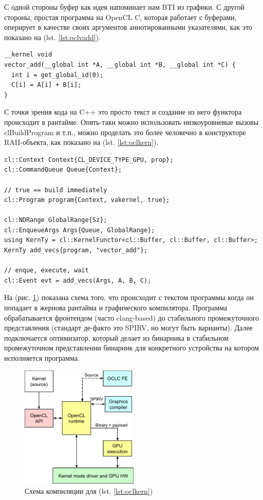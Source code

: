 \documentclass[a4paper,12pt,oneside]{article}
\begin{document}
С одной стороны буфер как идея напоминает нам BTI из графики. С другой стороны, простая программа на OpenCL C, которая работает с буферами, оперирует в качестве своих аргументов аннотированными указателями, как это показано на (lst. \ref{lst:oclvadd}).

\begin{lstlisting}[caption={Векторное сложение, OpenCL},label={lst:oclvadd}]
__kernel void
vector_add(__global int *A, __global int *B, __global int *C) {
  int i = get_global_id(0);
  C[i] = A[i] + B[i];
}
\end{lstlisting}

С точки зрения кода на C++ это просто текст и создание из него функтора происходит в рантайме.
Опять-таки можно использовать низкоуровневые вызовы clBuildProgram и т.п., можно проделать это более человечно в конструкторе RAII-объекта, как показано на (lst. \ref{lst:oclkern}).

\begin{lstlisting}[caption={Создание кернела, OpenCL},label={lst:oclkern}]
cl::Context Context{CL_DEVICE_TYPE_GPU, prop};
cl::CommandQueue Queue{Context};

// true == build immediately
cl::Program program{Context, vakernel, true};

cl::NDRange GlobalRange{Sz};
cl::EnqueueArgs Args{Queue, GlobalRange};
using KernTy = cl::KernelFunctor<cl::Buffer, cl::Buffer, cl::Buffer>;
KernTy add_vecs{program, "vector_add"};

// enque, execute, wait
cl::Event evt = add_vecs(Args, A, B, C);
\end{lstlisting}

На (рис. \ref{fig:oclkern}) показана схема того, что происходит с текстом программы когда он попадает в жернова рантайма и графического компилятора.
Программа обрабатывается фронтендом (часто clang-based) до стабильного промежуточного представления (стандарт де-факто это SPIRV, но могут быть варианты).
Далее подключается оптимизатор, который делает из бинарника в стабильном промежуточном представлении бинарник для конкретного устройства на котором исполняется программа.

\begin{figure}
\centering
\includegraphics[width=0.5\textwidth]{pictures/ocl-compilation-scheme.pdf}
\caption{Схема компиляции для (lst. \ref{lst:oclkern})}
\label{fig:oclkern}
\end{figure}
\end{document}
